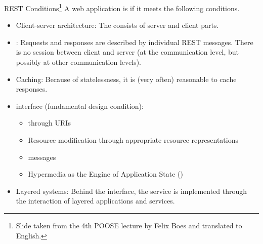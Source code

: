\documentclass[12pt, aspectratio=169, usepdftitle=false]{beamer}
\begin{document}
\begin{frame}{REST Conditions\footnote{Slide taken from the 4th POOSE lecture by Felix Boes and translated to English.}}
    \vspace{-0.3ex}
    A web application is  if it meets the following conditions. \pause
    \begin{itemize}
      \item Client-server architecture: The  consists of server and client parts. \pause
      \item {}: Requests and responses are  described by individual REST messages. \pause
        There is no session between client and server (at the  communication level, but possibly at other communication levels). \pause
      \item Caching: Because of statelessness, it is (very often) reasonable to cache responses. \pause
      \item {} interface (fundamental design condition):
        \begin{itemize}
          \item {} through URIs \pause
          \item Resource modification through appropriate resource representations \pause
          \item {} messages \pause
          \item Hypermedia as the Engine of Application State () \pause
        \end{itemize}
      \item Layered systems: Behind the interface, the service is implemented through the interaction of layered applications and services.
    \end{itemize}
  \end{frame}
\end{document}
